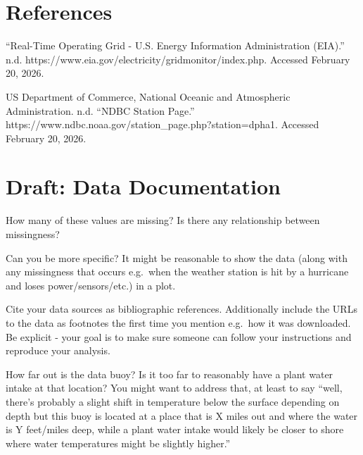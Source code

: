 \documentclass[
  letterpaper,
  DIV=11,
  numbers=noendperiod]{scrreprt}
\newlength{\cslhangindent}
\newenvironment{CSLReferences}[2] %
 {\begin{list}{}{%
  \setlength{\itemindent}{0pt}
  \setlength{\leftmargin}{0pt}
  \setlength{\parsep}{0pt}
  \ifodd #1
   \setlength{\leftmargin}{\cslhangindent}
   \setlength{\itemindent}{-1\cslhangindent}
  \fi
  \setlength{\itemsep}{#2\baselineskip}}}
 {\end{list}}
\begin{document}

\chapter*{References}\label{references}


\label{refs}
\begin{CSLReferences}{1}{0}
{``Real-Time {Operating Grid} - {U}.{S}. {Energy Information
Administration} ({EIA}).''} n.d.
https://www.eia.gov/electricity/gridmonitor/index.php. Accessed February
20, 2026.

US Department of Commerce, National Oceanic and Atmospheric
Administration. n.d. {``{NDBC Station Page}.''}
https://www.ndbc.noaa.gov/station\_page.php?station=dpha1. Accessed
February 20, 2026.

\end{CSLReferences}

\cleardoublepage
{}
{}
\appendix

\chapter{Draft: Data Documentation}\label{draft-data-documentation}

\begin{tcolorbox}[enhanced jigsaw, colframe=quarto-callout-note-color-frame, opacityback=0, left=2mm, toprule=.15mm, bottomtitle=1mm, opacitybacktitle=0.6, coltitle=black, leftrule=.75mm, breakable, colback=white, titlerule=0mm, title=\textcolor{quarto-callout-note-color}{\faInfo}\hspace{0.5em}{Note}, arc=.35mm, colbacktitle=quarto-callout-note-color!10!white, toptitle=1mm, bottomrule=.15mm, rightrule=.15mm]

How many of these values are missing? Is there any relationship between
missingness?

Can you be more specific? It might be reasonable to show the data (along
with any missingness that occurs e.g.~when the weather station is hit by
a hurricane and loses power/sensors/etc.) in a plot.

Cite your data sources as bibliographic references. Additionally include
the URLs to the data as footnotes\footnotemark{} the first time you
mention e.g.~how it was downloaded. Be explicit - your goal is to make
sure someone can follow your instructions and reproduce your analysis.

How far out is the data buoy? Is it too far to reasonably have a plant
water intake at that location? You might want to address that, at least
to say ``well, there's probably a slight shift in temperature below the
surface depending on depth but this buoy is located at a place that is X
miles out and where the water is Y feet/miles deep, while a plant water
intake would likely be closer to shore where water temperatures might be
slightly higher.''

\end{tcolorbox}
\end{document}

